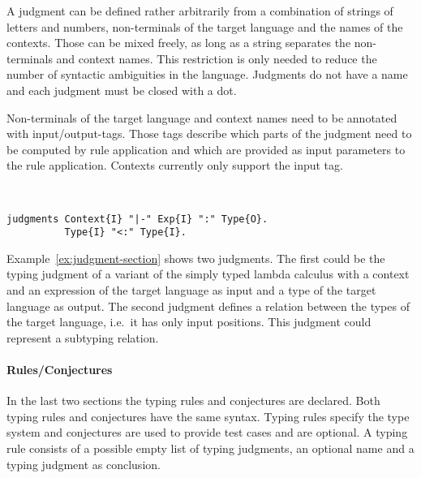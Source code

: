 A judgment can be defined rather arbitrarily from a combination of
strings of letters and numbers, non-terminals of the target language
and the names of the contexts. Those can be mixed freely, as long as a
string separates the non-terminals and context names. This restriction
is only needed to reduce the number of syntactic ambiguities in the
language. Judgments do not have a name and each judgment must be
closed with a dot.

Non-terminals of the target language and context names need to be
annotated with input/output-tags. Those tags describe which parts of
the judgment need to be computed by rule application and which are
provided as input parameters to the rule application. Contexts
currently only support the input tag.

\begin{example}{~}
\begin{verbatim}
judgments Context{I} "|-" Exp{I} ":" Type{O}.
          Type{I} "<:" Type{I}.
\end{verbatim}
\label{ex:judgment-section}
\end{example}

Example~\ref{ex:judgment-section} shows two judgments. The first could
be the typing judgment of a variant of the simply typed lambda
calculus with a context and an expression of the target language as
input and a type of the target language as output. The second judgment
defines a relation between the types of the target language, i.e.\ it
has only input positions. This judgment could represent a subtyping
relation.

\paragraph{Rules/Conjectures} In the last two sections the typing
rules and conjectures are declared. Both typing rules and conjectures
have the same syntax. Typing rules specify the type system and
conjectures are used to provide test cases and are optional. A typing
rule consists of a possible empty list of typing judgments, an
optional name and a typing judgment as conclusion.

